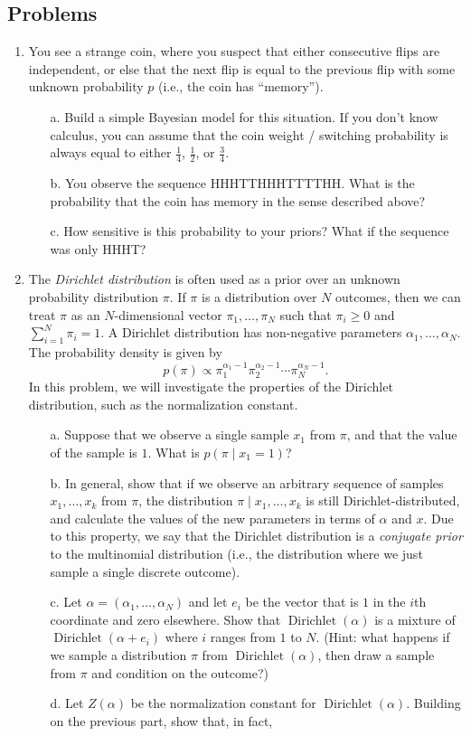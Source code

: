 \documentclass[11pt]{article}
\DeclareMathOperator{\Dirichlet}{Dirichlet}
\begin{document}
\subsection{Problems}
\begin{enumerate}
\item You see a strange coin, where you suspect that either consecutive flips are independent, or else that the next flip is equal to the previous flip with some unknown probability $p$ (i.e., the coin has ``memory'').
\begin{itemize}
\item[a.] Build a simple Bayesian model for this situation. If you don't know calculus, you can assume that the coin weight / switching probability is always equal to either $\frac{1}{4}$, $\frac{1}{2}$, or $\frac{3}{4}$.
\item[b.] You observe the sequence HHHTTHHHTTTTHH. What is the probability that the coin has memory in the sense described above?
\item [c.] How sensitive is this probability to your priors? What if the sequence was only HHHT?
\end{itemize}
\item The \emph{Dirichlet distribution} is often used as a prior over an unknown probability distribution $\pi$. If $\pi$ is a distribution over $N$ outcomes, then we can treat $\pi$ as an $N$-dimensional vector $\pi_1,\ldots,\pi_N$ such that $\pi_i \geq 0$ and $\sum_{i=1}^{N} \pi_i = 1$. A Dirichlet distribution has non-negative parameters $\alpha_1,\ldots,\alpha_N$. The probability density is given by 
\[ p(\pi) \propto \pi_1^{\alpha_1-1}\pi_2^{\alpha_2-1}\cdots\pi_N^{\alpha_N-1}. \]
In this problem, we will investigate the properties of the Dirichlet distribution, such as the normalization constant.
\begin{itemize}
\item[a.] Suppose that we observe a single sample $x_1$ from $\pi$, and that the value of the sample is $1$. What is $p(\pi \mid x_1=1)$?
\item [b.] In general, show that if we observe an arbitrary sequence of samples $x_1,\ldots,x_k$ from $\pi$, the distribution $\pi \mid x_1,\ldots,x_k$ is still Dirichlet-distributed, and calculate the values of the new parameters in terms of $\alpha$ and $x$. Due to this property, we say that the Dirichlet distribution is a \emph{conjugate prior} to the multinomial distribution (i.e., the distribution where we just sample a single discrete outcome).
\item [c.] Let $\alpha = (\alpha_1,\ldots,\alpha_N)$ and let $e_i$ be the vector that is $1$ in the $i$th coordinate and zero elsewhere. Show that $\Dirichlet(\alpha)$ is a mixture of $\Dirichlet(\alpha+e_i)$ where $i$ ranges from $1$ to $N$. (Hint: what happens if we sample a distribution $\pi$ from $\Dirichlet(\alpha)$, then draw a sample from $\pi$ and condition on the outcome?)
\item [d.] Let $Z(\alpha)$ be the normalization constant for $\Dirichlet(\alpha)$. Building on the previous part, show that, in fact, 


\end{itemize}
\end{enumerate}
\end{document}
